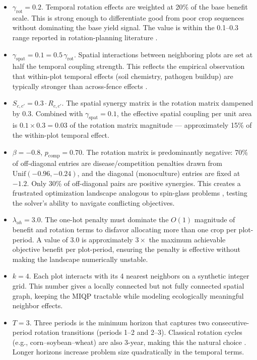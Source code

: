 \documentclass{oqireport}
\begin{document}
\begin{itemize}
    \item $\gamma_{\text{rot}} = 0.2$. Temporal rotation effects are weighted at 20\% of the base benefit scale. This is strong enough to differentiate good from poor crop sequences without dominating the base yield signal. The value is within the 0.1--0.3 range reported in rotation-planning literature \cite{preissel2015magnitude}.

    \item $\gamma_{\text{spat}} = 0.1 = 0.5\,\gamma_{\text{rot}}$. Spatial interactions between neighboring plots are set at half the temporal coupling strength. This reflects the empirical observation that within-plot temporal effects (soil chemistry, pathogen buildup) are typically stronger than across-fence effects \cite{karp2018crop}.

    \item $S_{c,c'} = 0.3 \cdot R_{c,c'}$. The spatial synergy matrix is the rotation matrix dampened by 0.3. Combined with $\gamma_{\text{spat}} = 0.1$, the effective spatial coupling per unit area is $0.1 \times 0.3 = 0.03$ of the rotation matrix magnitude — approximately 15\% of the within-plot temporal effect.

    \item $\beta = -0.8$, $p_{\text{comp}} = 0.70$. The rotation matrix is predominantly negative: 70\% of off-diagonal entries are disease/competition penalties drawn from $\text{Unif}(-0.96, -0.24)$, and the diagonal (monoculture) entries are fixed at $-1.2$. Only 30\% of off-diagonal pairs are positive synergies. This creates a frustrated optimization landscape analogous to spin-glass problems \cite{lucas2014ising}, testing the solver's ability to navigate conflicting objectives.

    \item $\lambda_{oh} = 3.0$. The one-hot penalty must dominate the $O(1)$ magnitude of benefit and rotation terms to disfavor allocating more than one crop per plot-period. A value of 3.0 is approximately $3\times$ the maximum achievable objective benefit per plot-period, ensuring the penalty is effective without making the landscape numerically unstable.


    \item $k = 4$. Each plot interacts with its 4 nearest neighbors on a synthetic integer grid. This number gives a locally connected but not fully connected spatial graph, keeping the MIQP tractable while modeling ecologically meaningful neighbor effects.

    \item $T = 3$. Three periods is the minimum horizon that captures two consecutive-period rotation transitions (periods 1--2 and 2--3). Classical rotation cycles (e.g., corn--soybean--wheat) are also 3-year, making this the natural choice \cite{haneveld2005crop}. Longer horizons increase problem size quadratically in the temporal terms.
\end{itemize}
\end{document}
